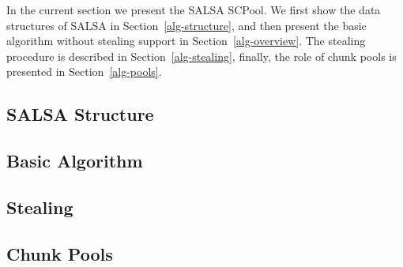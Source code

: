 \negspace
In the current section we present the SALSA SCPool. We first show the data structures of SALSA in Section~\ref{alg-structure}, and then present the basic algorithm without stealing support in Section~\ref{alg-overview}. The stealing procedure is described in Section~\ref{alg-stealing}, finally, the role of chunk pools is presented in Section~\ref{alg-pools}.
\negspace
\subsection{SALSA Structure\label{alg-structure}}

\negspace
\subsection{Basic Algorithm\label{alg-overview}}

\negspace
\subsection{Stealing\label{alg-stealing}}

\negspace
\subsection{Chunk Pools\label{alg-pools}}
